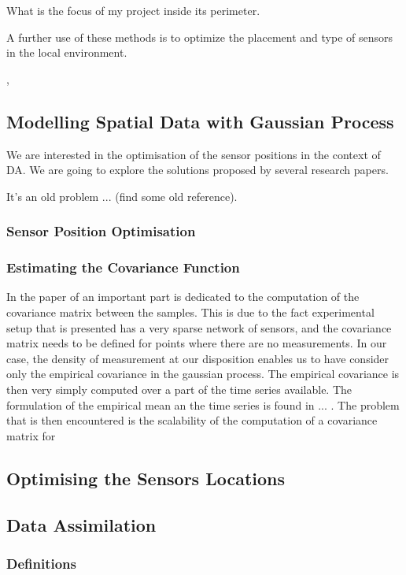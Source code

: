 \documentclass[11pt,a4paper]{article}
\numberwithin{equation}{section}
\begin{document}
What is the focus of my project inside its perimeter. 

A further use of these methods is to optimize the placement and type of sensors in the local environment. 

\cite{song_natural_2018}, 


\subsection{Modelling Spatial Data with Gaussian Process}

We are interested in the optimisation of the sensor positions in the context of DA. We are going to explore the solutions proposed by several research papers. 

It's an old problem ... (find some old reference).   

\subsubsection{Sensor Position Optimisation}

\subsubsection{Estimating the Covariance Function}
In the paper of \citep*{krause_near-optimal_2008} an important part is dedicated to the computation of the covariance matrix between the samples. This is due to the fact experimental setup that is presented has a very sparse network of sensors, and the covariance matrix needs to be defined for points where there are no measurements. In our case, the density of measurement at our disposition enables us to have consider only the empirical covariance in the gaussian process. 
The empirical covariance is then very simply computed over a part of the time series available. The formulation of the empirical mean an the time series is found in ... . 
The problem that is then encountered is the scalability of the computation of a covariance matrix for 


\subsection{Optimising the Sensors Locations}

\subsection{Data Assimilation}

\subsubsection{Definitions}
\end{document}
